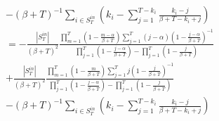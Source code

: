 \documentclass[a4paper, 12pt]{article}
\begin{document}
\begin{itemize}
\begin{align}
        &-(\beta + T)^{-1}\sum_{i \in S_T^{in}} \left(k_i - \sum_{j = 1}^{T - k_i} \frac{k_i - j}{\beta + T - k_i + j}\right) \nonumber \\
        &= -\frac{|S_T^{in}|}{(\beta + T)^2}\frac{\prod_{ m =1}^{T} (1 - \frac{m - \alpha}{\beta + T}) \sum_{j = 1}^T (j - \alpha)(1 - \frac{j - \alpha}{\beta + T})^{-1}}{\prod_{j=1}^T (1 - \frac{j - \alpha}{\beta + T}) - \prod_{j=1}^T (1 - \frac{j}{\beta + T})}\nonumber \\
        &+ \frac{|S_T^{in}|}{(\beta + T)^2} \frac{\prod_{m = 1}^{T} (1 - \frac{m}{\beta + T}) \sum_{j = 1}^{T} j (1 - \frac{j}{\beta + T})^{-1}}{\prod_{j=1}^T (1 - \frac{j - \alpha}{\beta + T}) - \prod_{j=1}^T (1 - \frac{j}{\beta + T})} \nonumber \\
        &-(\beta + T)^{-1}\sum_{i \in S_T^{in}} \left(k_i - \sum_{j = 1}^{T - k_i} \frac{k_i - j}{\beta + T - k_i + j}\right)
    \end{align}
\end{itemize}
\end{document}
